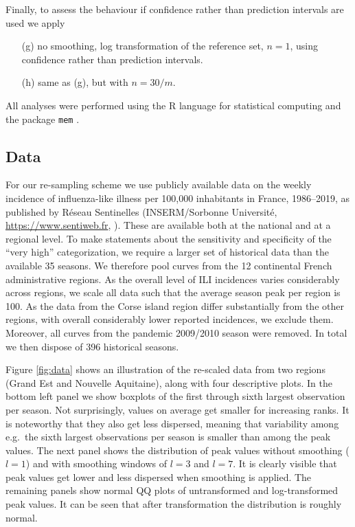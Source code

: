 \documentclass{article}
\begin{document}
Finally, to assess the behaviour if confidence rather than prediction intervals are used we apply
\begin{enumerate}
\item[(g)] no smoothing, log transformation of the reference set, $n = 1$, using confidence rather than prediction intervals.
\item[(h)] same as (g), but with $n = 30/m$.
\end{enumerate}
All analyses were performed using the R language for statistical computing \citep{RCT2020} and the package \texttt{mem} \citep{Lozano2020}.

\subsection{Data}
\label{subsec:data}

For our re-sampling scheme we use publicly available data on the weekly incidence of influenza-like illness per 100,000 inhabitants in France, 1986--2019, as published by Réseau Sentinelles (INSERM/Sorbonne Université, \url{https://www.sentiweb.fr}, \citealt{Flahault2006}). These are available both at the national and at a regional level. To make statements about the sensitivity and specificity of the ``very high'' categorization, we require a larger set of historical data than the available 35 seasons. We therefore pool curves from the 12 continental French administrative regions. As the overall level of ILI incidences varies considerably across regions, we scale all data such that the average season peak per region is 100. As the data from the Corse island region differ substantially from the other regions, with overall considerably lower reported incidences, we exclude them. Moreover, all curves from the pandemic 2009/2010 season were removed. In total we then dispose of 396 historical seasons.

Figure \ref{fig:data} shows an illustration of the re-scaled data from two regions (Grand Est and Nouvelle Aquitaine), along with four descriptive plots. In the bottom left panel we show boxplots of the first through sixth largest observation per season. Not surprisingly, values on average get smaller for increasing ranks. It is noteworthy that they also get less dispersed, meaning that variability among e.g.\ the sixth largest observations per season is smaller than among the peak values. The next panel shows the distribution of peak values without smoothing ($l = 1$) and with smoothing windows of $l = 3$ and $l = 7$. It is clearly visible that peak values get lower and less dispersed when smoothing is applied. The remaining panels show normal QQ plots of untransformed and log-transformed peak values. It can be seen that after transformation the distribution is roughly normal.
\end{document}

